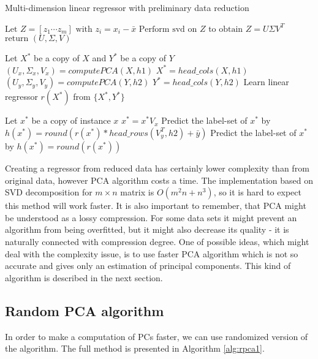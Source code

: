 \begin{algorithm}
    \caption{Multi-dimension linear regressor with preliminary data reduction}\label{alg:pca1}
    \begin{algorithmic}[1]
        \State $\text{Let } Z=[z_1 \cdots z_m] \text{ with } z_i = x_i-\bar{x}$
        \State $\text{Perform svd on } Z \text{ to obtain } Z = U\Sigma{V^T}$
        \State $\text{return } (U,\Sigma,V)$
    \EndFunction
    \item[] 
    \State Let $X^{*}$ be a copy of $X$ and $Y^{*}$ be a copy of $Y$
        \State $(U_x, \Sigma_{x}, V_x) = computePCA(X,h1)$
        \State $X^{*}=head\_cols(X, h1)$
    \EndIf
        \State $(U_y, \Sigma_{y}, V_y) = computePCA(Y,h2)$
        \State $Y^{*}=head\_cols(Y, h2)$
    \EndIf
    \State Learn linear regressor $r(X^*)$ from $\{X^*,Y^*\}$
    \item[]
    \State Let $x^*$ be a copy of instance $x$
        \State $x^* = x^*V_x$
    \EndIf
        \State Predict the label-set of $x^*$ by $h(x^*)=round( r(x^*) * head\_rows(V_y^T, h2) + \bar{y})$ 
    \Else
        \State Predict the label-set of $x^*$ by $h(x^*)=round( r(x^*) )$ 
    \EndIf

    \end{algorithmic}
\end{algorithm}

Creating a regressor from reduced data has certainly lower complexity than from original data, however PCA algorithm costs a time. The implementation based on SVD decomposition for $m\times{n}$ matrix is $O(m^2n + n^3)$, so it is hard to expect this method will work faster. It is also important to remember, that PCA might be understood as a lossy compression. For some data sets it might prevent an algorithm from being overfitted, but it might also decrease its quality - it is naturally connected with compression degree. 
One of possible ideas, which might deal with the complexity issue, is to use faster PCA algorithm which is not so accurate and gives only an estimation of principal components. This kind of algorithm is described in the next section.

\subsection{Random PCA algorithm}

In order to make a computation of PCs faster, we can use randomized version of the algorithm. The full method is presented in Algorithm \ref{alg:rpca1}. 

